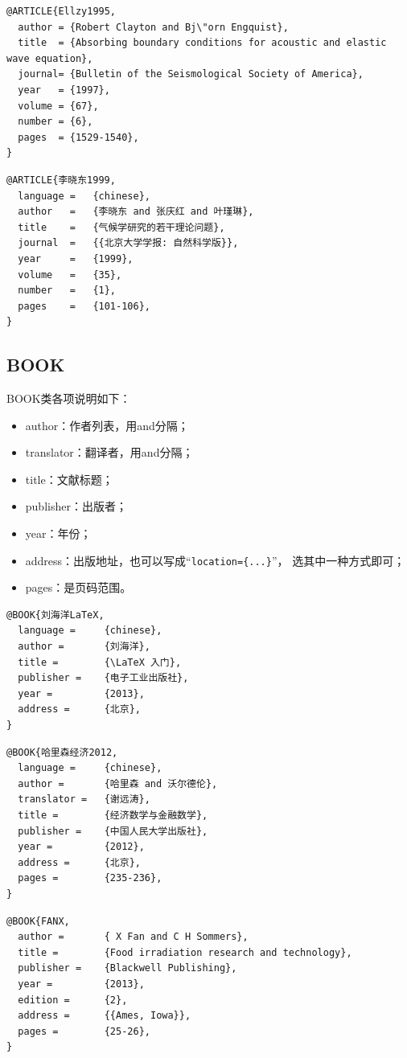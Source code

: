 \begin{Verbatim}[]
@ARTICLE{Ellzy1995,
  author = {Robert Clayton and Bj\"orn Engquist},
  title  = {Absorbing boundary conditions for acoustic and elastic wave equation},
  journal= {Bulletin of the Seismological Society of America},
  year   = {1997},
  volume = {67},
  number = {6},
  pages  = {1529-1540},
}
\end{Verbatim}
\begin{Verbatim}[]
@ARTICLE{李晓东1999,
  language =   {chinese},
  author   =   {李晓东 and 张庆红 and 叶瑾琳},
  title    =   {气候学研究的若干理论问题},
  journal  =   {{北京大学学报: 自然科学版}},
  year     =   {1999},
  volume   =   {35},
  number   =   {1},
  pages    =   {101-106},
}
\end{Verbatim}

\subsection{BOOK}
BOOK类各项说明如下：
\begin{itemize}
\itemsep=0pt \parskip=0pt
  \item author：作者列表，用and分隔；
  \item translator：翻译者，用and分隔；%
  \item title：文献标题；%
  \item publisher：出版者；
  \item year：年份；
  \item address：出版地址，也可以写成“\verb"location={...}"”，%
    选其中一种方式即可；
  \item pages：是页码范围。
\end{itemize}
\begin{Verbatim}[]
@BOOK{刘海洋LaTeX,
  language =     {chinese},
  author =       {刘海洋},
  title =        {\LaTeX 入门},
  publisher =    {电子工业出版社},
  year =         {2013},
  address =      {北京},
}
\end{Verbatim}
\begin{Verbatim}[]
@BOOK{哈里森经济2012,
  language =     {chinese},
  author =       {哈里森 and 沃尔德伦},
  translator =   {谢远涛},
  title =        {经济数学与金融数学},
  publisher =    {中国人民大学出版社},
  year =         {2012},
  address =      {北京},
  pages =        {235-236},
}
\end{Verbatim}
\begin{Verbatim}[]
@BOOK{FANX,
  author =       { X Fan and C H Sommers},
  title =        {Food irradiation research and technology},
  publisher =    {Blackwell Publishing},
  year =         {2013},
  edition =      {2},
  address =      {{Ames, Iowa}},
  pages =        {25-26},
}
\end{Verbatim}

